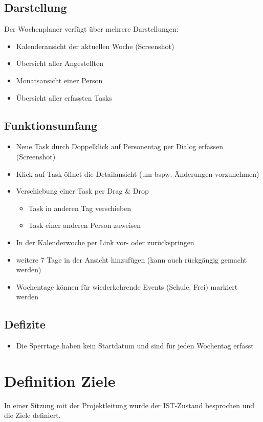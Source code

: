 \subsection{Darstellung}
Der Wochenplaner verfügt über mehrere Darstellungen:
\begin{itemize}
    \item Kalenderansicht der aktuellen Woche (Screenshot)
    \item Übersicht aller Angestellten
    \item Monatsansicht einer Person
    \item Übersicht aller erfassten Tasks
\end{itemize}

\subsection{Funktionsumfang}
\begin{itemize}
    \item Neue Task durch Doppelklick auf Personentag per Dialog erfassen (Screenshot)
    \item Klick auf Task öffnet die Detailansicht (um bspw. Änderungen vorzunehmen)
    \item Verschiebung einer Task per Drag \& Drop
    \begin{itemize}
        \item Task in anderen Tag verschieben
        \item Task einer anderen Person zuweisen
    \end{itemize}
    \item In der Kalenderwoche per Link vor- oder zurückspringen
    \item weitere 7 Tage in der Ansicht hinzufügen (kann auch rückgängig gemacht werden)
    \item Wochentage können für wiederkehrende Events (Schule, Frei) markiert werden
\end{itemize}
\subsection{Defizite}
    \begin{itemize}
        \item Die Sperrtage haben kein Startdatum und sind für jeden Wochentag erfasst
    \end{itemize}

\section{Definition Ziele}
In einer Sitzung mit der Projektleitung wurde der IST-Zustand besprochen und die Ziele definiert.


